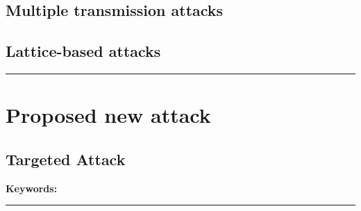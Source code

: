 \subsection{Multiple transmission attacks}

\subsection{Lattice-based attacks}

\par\noindent\rule{\textwidth}{0.4pt}

\section{Proposed new attack}

\subsection{Targeted Attack}

\textbf{Keywords:} 
\par\noindent\rule{\textwidth}{0.4pt}
\newpage
